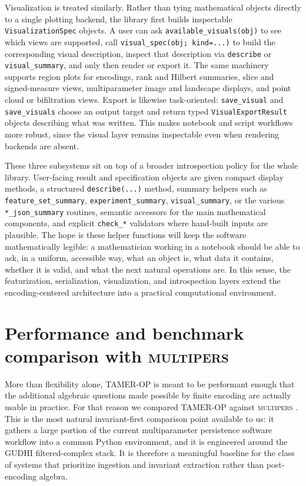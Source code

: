 \documentclass[11pt]{article}
\newcommand{\TAMER}{\textsc{TAMER-OP}}
\newcommand{\multipers}{\textsc{multipers}}
\theoremstyle{definition}
\theoremstyle{remark}
\begin{document}
Visualization is treated similarly.  Rather than tying mathematical objects directly to a single plotting backend, the library first builds inspectable \texttt{VisualizationSpec} objects.  A user can ask \texttt{available\_visuals(obj)} to see which views are supported, call \texttt{visual\_spec(obj; kind=...)} to build the corresponding visual description, inspect that description via \texttt{describe} or \texttt{visual\_summary}, and only then render or export it.  The same machinery supports region plots for encodings, rank and Hilbert summaries, slice and signed-measure views, multiparameter image and landscape displays, and point cloud or bifiltration views.  Export is likewise task-oriented: \texttt{save\_visual} and \texttt{save\_visuals} choose an output target and return typed \texttt{VisualExportResult} objects describing what was written.  This makes notebook and script workflows more robust, since the visual layer remains inspectable even when rendering backends are absent.

These three subsystems sit on top of a broader introspection policy for the whole library. User-facing result and specification objects are given compact display methods, a structured \texttt{describe(...)} method, summary helpers such as \texttt{feature\_set\_summary}, \texttt{experiment\_summary}, \texttt{visual\_summary}, or the various \texttt{*\_json\_summary} routines, semantic accessors for the main mathematical components, and explicit \texttt{check\_*} validators where hand-built inputs are plausible. The hope is these helper functions will keep the software mathematically legible: a mathematician working in a notebook should be able to ask, in a uniform, accessible way, what an object is, what data it contains, whether it is valid, and what the next natural operations are.  In this sense, the featurization, serialization, visualization, and introspection layers extend the encoding-centered architecture into a practical computational environment.

\section{Performance and benchmark comparison with \multipers{}}\label{sec:benchmarks}

More than flexibility alone, \TAMER{} is meant to be performant enough that the additional algebraic questions made possible by finite encoding are actually usable in practice.  For that reason we compared \TAMER{} against \multipers{} \cite{LS24}.  This is the most natural invariant-first comparison point available to us: it gathers a large portion of the current multiparameter persistence software workflow into a common Python environment, and it is engineered around the GUDHI filtered-complex stack.  It is therefore a meaningful baseline for the class of systems that prioritize ingestion and invariant extraction rather than post-encoding algebra.
\end{document}
